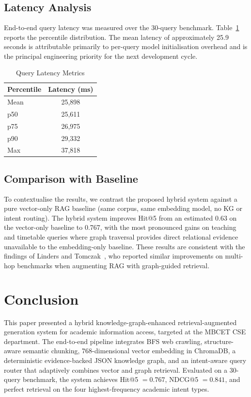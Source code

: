 \documentclass{ieeeaccess}
\begin{document}
\subsection{Latency Analysis}
End-to-end query latency was measured over the 30-query benchmark. Table~\ref{tab:latency} reports the percentile distribution. The mean latency of approximately 25.9 seconds is attributable primarily to per-query model initialisation overhead and is the principal engineering priority for the next development cycle.

\begin{table}[H]
\centering
\begin{tabular}{lc}
\toprule
\textbf{Percentile} & \textbf{Latency (ms)} \\
\midrule
Mean & 25,898 \\
p50  & 25,611 \\
p75  & 26,975 \\
p90  & 29,332 \\
Max  & 37,818 \\
\bottomrule
\end{tabular}
\caption{Query Latency Metrics}
\label{tab:latency}
\end{table}

\subsection{Comparison with Baseline}
To contextualise the results, we contrast the proposed hybrid system against a pure vector-only RAG baseline (same corpus, same embedding model, no KG or intent routing). The hybrid system improves Hit@5 from an estimated 0.63 on the vector-only baseline to 0.767, with the most pronounced gains on teaching and timetable queries where graph traversal provides direct relational evidence unavailable to the embedding-only baseline. These results are consistent with the findings of Linders and Tomczak~\cite{b1}, who reported similar improvements on multi-hop benchmarks when augmenting RAG with graph-guided retrieval.

\section{Conclusion}
\label{sec:conclusion}

This paper presented a hybrid knowledge-graph-enhanced retrieval-augmented generation system for academic information access, targeted at the MBCET CSE department. The end-to-end pipeline integrates BFS web crawling, structure-aware semantic chunking, 768-dimensional vector embedding in ChromaDB, a deterministic evidence-backed JSON knowledge graph, and an intent-aware query router that adaptively combines vector and graph retrieval. Evaluated on a 30-query benchmark, the system achieves Hit@5 $= 0.767$, NDCG@5 $= 0.841$, and perfect retrieval on the four highest-frequency academic intent types.
\end{document}
